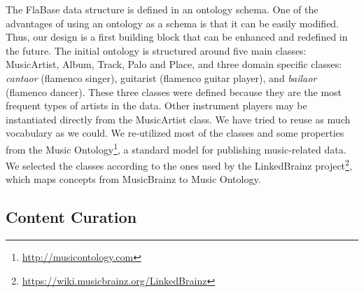 The FlaBase data structure is defined in an ontology schema. One of the advantages of using an ontology as a schema is that it can be easily modified. Thus, our design is a first building block that can be enhanced and redefined in the future. The initial ontology is structured around five main classes: MusicArtist, Album, Track, Palo and Place, and three domain specific classes: \textit{cantaor} (flamenco singer), guitarist (flamenco guitar player), and \textit{bailaor} (flamenco dancer). These three classes were defined because they are the most frequent types of artists in the data. Other instrument players may be instantiated directly from the MusicArtist class. 
We have tried to reuse as much vocabulary as we could. We re-utilized most of the classes and some properties from the Music Ontology\footnote{\url{http://musicontology.com}}, a standard model for publishing music-related data. We selected the classes according to the ones used by the LinkedBrainz project\footnote{\url{https://wiki.musicbrainz.org/LinkedBrainz}}, which maps concepts from MusicBrainz to Music Ontology.

\subsection{Content Curation}\label{sec:musicology:kb_curation}

